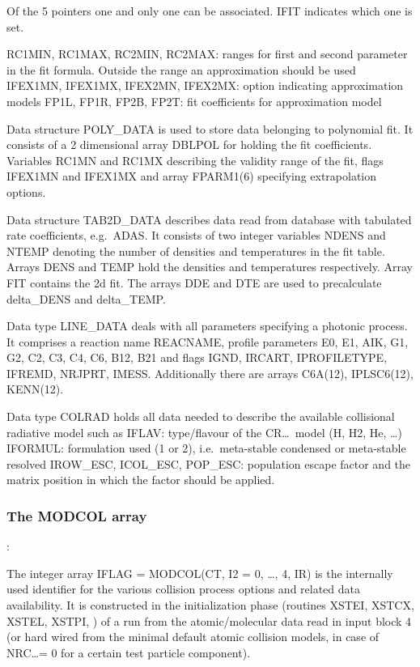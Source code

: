 Of the 5 pointers one and only one can be associated.
IFIT indicates which one is set.

RC1MIN, RC1MAX, RC2MIN, RC2MAX: ranges for first and second parameter in the
fit formula.
Outside the range an approximation should be used IFEX1MN, IFEX1MX, IFEX2MN,
IFEX2MX: option indicating approximation models FP1L, FP1R, FP2B, FP2T: fit
coefficients for approximation model 

Data structure POLY\_DATA is used to store data belonging to polynomial fit.
It consists of a 2 dimensional array DBLPOL for holding the fit coefficients.
Variables RC1MN and RC1MX describing the validity range of the fit, flags
IFEX1MN and IFEX1MX and array FPARM1(6) specifying extrapolation options.

Data structure TAB2D\_DATA describes data read from database with tabulated
rate coefficients, e.g.\ \ac{ADAS}.
It consists of two integer variables NDENS and NTEMP denoting the number of
densities and temperatures in the fit table.
Arrays DENS and TEMP hold the densities and temperatures respectively.
Array FIT contains the 2d fit.
The arrays DDE and DTE are used to precalculate delta\_DENS and delta\_TEMP.

Data type LINE\_DATA deals with all parameters specifying a photonic process.
It comprises a reaction name REACNAME, profile parameters E0, E1, AIK, G1, G2,
C2, C3, C4, C6, B12, B21 and flags IGND, IRCART, IPROFILETYPE, IFREMD, NRJPRT,
IMESS.
Additionally there are arrays  C6A(12), IPLSC6(12), KENN(12).

Data type COLRAD holds all data needed to describe the available collisional
radiative model such as IFLAV: type/flavour of the CR\dots\ model (H, H2, He,
\dots) IFORMUL: formulation used (1 or 2), i.e.\ meta-stable condensed or
meta-stable resolved IROW\_ESC, ICOL\_ESC, POP\_ESC: population escape factor
and the matrix position in which the factor should be applied.

\subsubsection{The MODCOL array}:

The integer array IFLAG = MODCOL(CT, I2 = 0, \dots, 4, IR) is the internally
used identifier for the various collision process options and related data
availability.
It is constructed in the initialization phase (routines XSTEI, XSTCX, XSTEL,
XSTPI, ) of a run from the atomic\slash molecular data read in input block 4
(or hard wired from the minimal default atomic collision models, in case of
NRC\dots = 0 for a certain test particle component).

